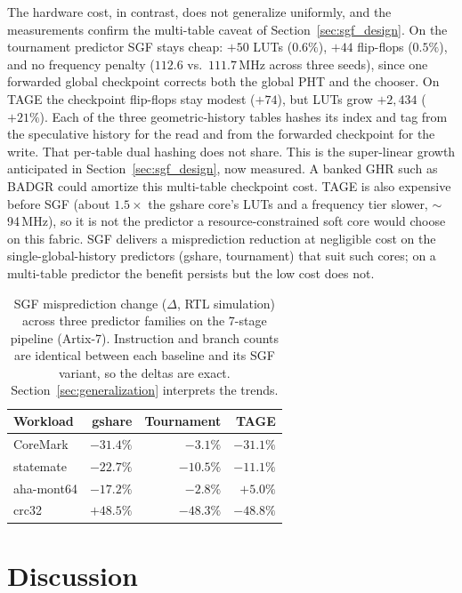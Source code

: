 \documentclass[acmsmall,nonacm,screen]{acmart}
\begin{document}
The hardware cost, in contrast, does not generalize uniformly, and the measurements confirm the multi-table caveat of Section~\ref{sec:sgf_design}. On the tournament predictor SGF stays cheap: $+50$ LUTs ($0.6\%$), $+44$ flip-flops ($0.5\%$), and no frequency penalty ($112.6$ vs.\ $111.7$\,MHz across three seeds), since one forwarded global checkpoint corrects both the global PHT and the chooser. On TAGE the checkpoint flip-flops stay modest ($+74$), but LUTs grow $+2{,}434$ ($+21\%$). Each of the three geometric-history tables hashes its index and tag from the speculative history for the read and from the forwarded checkpoint for the write. That per-table dual hashing does not share. This is the super-linear growth anticipated in Section~\ref{sec:sgf_design}, now measured. A banked GHR such as BADGR \cite{schlais2016badgr} could amortize this multi-table checkpoint cost. TAGE is also expensive before SGF (about $1.5\times$ the gshare core's LUTs and a frequency tier slower, $\sim$94\,MHz), so it is not the predictor a resource-constrained soft core would choose on this fabric. SGF delivers a misprediction reduction at negligible cost on the single-global-history predictors (gshare, tournament) that suit such cores; on a multi-table predictor the benefit persists but the low cost does not.

\begin{table}[t]
\centering
\caption{SGF misprediction change ($\Delta$, RTL simulation) across three predictor families on the 7-stage pipeline (Artix-7). Instruction and branch counts are identical between each baseline and its SGF variant, so the deltas are exact. Section~\ref{sec:generalization} interprets the trends.}
\label{tab:families}
\small
\begin{tabular}{@{}l rrr@{}}
\toprule
\textbf{Workload} & \textbf{gshare} & \textbf{Tournament} & \textbf{TAGE} \\
\midrule
CoreMark   & $-31.4\%$ & $-3.1\%$  & $-31.1\%$ \\
statemate  & $-22.7\%$ & $-10.5\%$ & $-11.1\%$ \\
aha-mont64 & $-17.2\%$ & $-2.8\%$  & $+5.0\%$ \\
crc32      & $+48.5\%$ & $-48.3\%$ & $-48.8\%$ \\
\bottomrule
\end{tabular}
\end{table}

\section{Discussion}
\label{sec:discussion}
\end{document}
